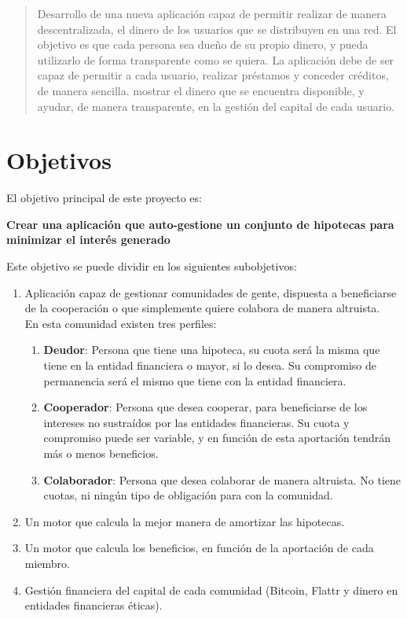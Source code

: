 \documentclass[10pt]{article}
\begin{document}
\title{}
\author{Diego Pardilla}
\date{\today}


\maketitle

\begin{abstract}
Desarrollo de una nueva aplicación capaz de permitir realizar de manera descentralizada, el dinero de los usuarios que se distribuyen en una red. El objetivo es que cada persona sea dueño de su propio dinero, y pueda utilizarlo de forma transparente como se quiera. La aplicación debe de ser capaz de permitir a cada usuario, realizar préstamos y conceder créditos, de manera sencilla. mostrar el dinero que se encuentra disponible, y ayudar, de manera transparente, en la gestión del capital de cada usuario.  
\end{abstract}

\section{Objetivos}

El objetivo principal de este proyecto es:

\begin{center}
\bf{Crear una aplicación que auto-gestione un conjunto de hipotecas para minimizar el interés generado}
\end{center}

Este objetivo se puede dividir en los siguientes subobjetivos:

\begin{enumerate}
  \item Aplicación capaz de gestionar comunidades de gente, dispuesta a beneficiarse de la cooperación o que simplemente quiere colabora de manera altruista.\\ 
En esta comunidad existen tres perfiles:
\begin{enumerate}
\item \textbf{Deudor}: Persona que tiene una hipoteca, su cuota será la misma que tiene en la entidad financiera o mayor, si lo desea. Su compromiso de permanencia será el mismo que tiene con la entidad financiera.
\item \textbf{Cooperador}: Persona que desea cooperar, para beneficiarse de los intereses no sustraídos por las entidades financieras. Su cuota y compromiso puede ser variable, y en función de esta aportación tendrán más o menos beneficios.
\item \textbf{Colaborador}: Persona que desea colaborar de manera altruista. No tiene cuotas, ni ningún tipo de obligación para con la comunidad.
\end{enumerate}
  \item Un motor que calcula la mejor manera de amortizar las hipotecas.
  \item Un motor que calcula los beneficios, en función de la aportación de cada miembro.
  \item Gestión financiera del capital de cada comunidad (Bitcoin, Flattr y dinero en entidades financieras éticas).
\end{enumerate}
\end{document}

